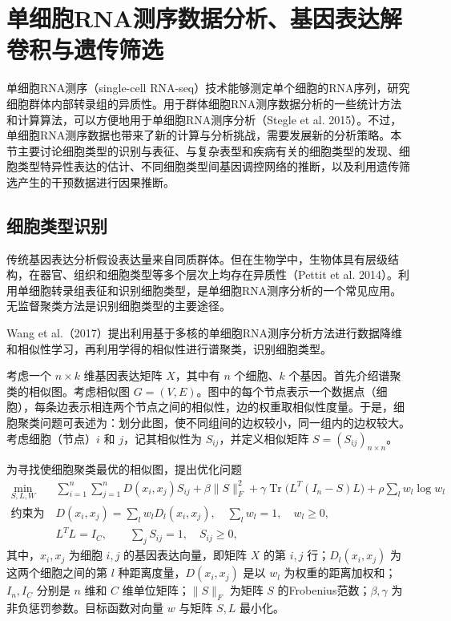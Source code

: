 \section{单细胞RNA测序数据分析、基因表达解卷积与遗传筛选}

单细胞RNA测序（single-cell RNA-seq）技术能够测定单个细胞的RNA序列，研究细胞群体内部转录组的异质性。用于群体细胞RNA测序数据分析的一些统计方法和计算算法，可以方便地用于单细胞RNA测序分析（Stegle et al. 2015）。不过，单细胞RNA测序数据也带来了新的计算与分析挑战，需要发展新的分析策略。本节主要讨论细胞类型的识别与表征、与复杂表型和疾病有关的细胞类型的发现、细胞类型特异性表达的估计、不同细胞类型间基因调控网络的推断，以及利用遗传筛选产生的干预数据进行因果推断。

\subsection{细胞类型识别}

传统基因表达分析假设表达量来自同质群体。但在生物学中，生物体具有层级结构，在器官、组织和细胞类型等多个层次上均存在异质性（Pettit et al. 2014）。利用单细胞转录组表征和识别细胞类型，是单细胞RNA测序分析的一个常见应用。无监督聚类方法是识别细胞类型的主要途径。

Wang et al.（2017）提出利用基于多核的单细胞RNA测序分析方法进行数据降维和相似性学习，再利用学得的相似性进行谱聚类，识别细胞类型。

考虑一个 $n\times k$ 维基因表达矩阵 $X$，其中有 $n$ 个细胞、$k$ 个基因。首先介绍谱聚类的相似图。考虑相似图 $G=(V,E)$。图中的每个节点表示一个数据点（细胞），每条边表示相连两个节点之间的相似性，边的权重取相似性度量。于是，细胞聚类问题可表述为：划分此图，使不同组间的边权较小，同一组内的边权较大。考虑细胞（节点）$i$ 和 $j$，记其相似性为 $S_{ij}$，并定义相似矩阵 $S=(S_{ij})_{n\times n}$。

为寻找使细胞聚类最优的相似图，提出优化问题
\begin{equation}
\begin{aligned}
\min_{S,L,W}\quad
 &\sum_{i=1}^{n}\sum_{j=1}^{n}D(x_i,x_j)S_{ij}
 +\beta\|S\|_F^2+\gamma\operatorname{Tr}\bigl(L^T(I_n-S)L\bigr)
 +\rho\sum_lw_l\log w_l\\
\text{约束为}\quad
 &D(x_i,x_j)=\sum_lw_lD_l(x_i,x_j),\quad
 \sum_lw_l=1,\quad w_l\ge0,\\
 &L^TL=I_C,\qquad\sum_jS_{ij}=1,\quad S_{ij}\ge0,
\end{aligned}\tag{4.230}
\end{equation}
其中，$x_i,x_j$ 为细胞 $i,j$ 的基因表达向量，即矩阵 $X$ 的第 $i,j$ 行；$D_l(x_i,x_j)$ 为这两个细胞之间的第 $l$ 种距离度量，$D(x_i,x_j)$ 是以 $w_l$ 为权重的距离加权和；$I_n,I_C$ 分别是 $n$ 维和 $C$ 维单位矩阵；$\|S\|_F$ 为矩阵 $S$ 的Frobenius范数；$\beta,\gamma$ 为非负惩罚参数。目标函数对向量 $w$ 与矩阵 $S,L$ 最小化。

